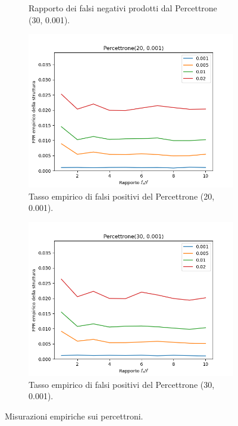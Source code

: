 \documentclass[../../main.tex]{subfiles}
\begin{document}
\begin{figure}[H]
\begin{subfigure}[b]{0.49\textwidth}
            \caption{Rapporto dei falsi negativi prodotti dal Percettrone (30, 0.001).}
            \label{fig:SLBFFNRPercettrone30}
        \end{subfigure}
        \begin{subfigure}[b]{0.49\textwidth}
            \centering
            \includegraphics[width = \textwidth]{immagini/7/SLBF/Percettrone(20, 0.001)_FPR.png}
            \caption{Tasso empirico di falsi positivi del Percettrone (20, 0.001).}
            \label{fig:SLBFFPRPercettrone20}
        \end{subfigure}
        \begin{subfigure}[b]{0.49\textwidth}
            \centering
            \includegraphics[width = \textwidth]{immagini/7/SLBF/Percettrone(30, 0.001)_FPR.png}
            \caption{Tasso empirico di falsi positivi del Percettrone (30, 0.001).}
            \label{fig:SLBFFPRPercettrone30}
        \end{subfigure}
        \caption{Misurazioni empiriche sui percettroni.}
        \label{fig:percettroneEmpiricoSLBF}
    \end{figure}
\end{document}
